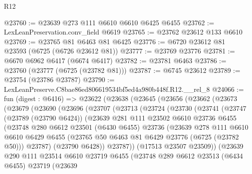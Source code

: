 \begin{lexlean}{R12}
\begin{coremodule}
@23760 := @23639 @273 @111 @6610 @6610 @6425 @6455
@23762 := LexLeanPreservation.conv_field @6619
@23765 := @23762 @23612 @133 @6610
@23769 := @23765 @81 @6463 @81 @6425
@23776 := @6720 @23612 @81 @23593 (@6725 (@6726 @23612 @81))
@23777 := @23769 @23776
@23781 := @6670 @6962 @6417 (@6674 @6417)
@23782 := @23781 @6463
@23786 := @23760 (@23777 (@6725 (@23782 @81)))
@23787 := @6745 @23612
@23789 := @23754 (@23786 @23787)
@23790 := LexLeanPreserve.C8bae86ed806619534bf5ed4a980b448f.R12.__rel_8
@24066 := fun (digest : @6416) =>
  @23622
    (@23638
      (@23645
        (@23656
          (@23662
            (@23673
              (@23679
                (@23690
                  (@23696
                    (@23707
                      (@23713
                        (@23724
                          (@23730
                            (@23741
                              (@23747
                                (@23789 (@23790 @6424))
                                (@23639
                                  @281
                                  @111
                                  @23502
                                  @6610
                                  @23736
                                  @6455
                                  (@23748
                                    @280
                                    @6612
                                    @23501
                                    (@6430 @6455)
                                    @23736
                                    (@23639
                                      @278
                                      @111
                                      @6610
                                      @6610
                                      @6429
                                      @6455
                                      (@23765 @50 @6463 @81 @6429 @23776 (@6725 (@23782 @50)))
                                      @23787)
                                    (@23790 @6428))
                                  @23787))
                              (@17513 @23507 @23509))
                            (@23639
                              @290
                              @111
                              @23514
                              @6610
                              @23719
                              @6455
                              (@23748
                                @289
                                @6612
                                @23513
                                (@6434 @6455)
                                @23719
                                (@23639

\end{coremodule}
\end{lexlean}

